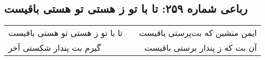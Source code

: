 \begin{center}
\section*{رباعی شماره ۲۵۹: تا با تو ز هستی تو هستی باقیست}
\label{sec:0259}
\begin{longtable}{l p{0.5cm} r}
تا با تو ز هستی تو هستی باقیست
&&
ایمن منشین که بت‌پرستی باقیست
\\
گیرم بت پندار شکستی آخر
&&
آن بت که ز پندار برستی باقیست
\\
\end{longtable}
\end{center}
